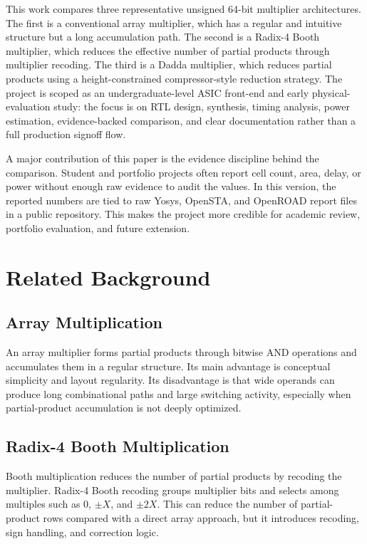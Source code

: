 \documentclass[conference]{IEEEtran}
\begin{document}
This work compares three representative unsigned 64-bit multiplier architectures. The first is a conventional array multiplier, which has a regular and intuitive structure but a long accumulation path. The second is a Radix-4 Booth multiplier, which reduces the effective number of partial products through multiplier recoding. The third is a Dadda multiplier, which reduces partial products using a height-constrained compressor-style reduction strategy. The project is scoped as an undergraduate-level ASIC front-end and early physical-evaluation study: the focus is on RTL design, synthesis, timing analysis, power estimation, evidence-backed comparison, and clear documentation rather than a full production signoff flow.

A major contribution of this paper is the evidence discipline behind the comparison. Student and portfolio projects often report cell count, area, delay, or power without enough raw evidence to audit the values. In this version, the reported numbers are tied to raw Yosys, OpenSTA, and OpenROAD report files in a public repository. This makes the project more credible for academic review, portfolio evaluation, and future extension.

\section{Related Background}

\subsection{Array Multiplication}
An array multiplier forms partial products through bitwise AND operations and accumulates them in a regular structure. Its main advantage is conceptual simplicity and layout regularity. Its disadvantage is that wide operands can produce long combinational paths and large switching activity, especially when partial-product accumulation is not deeply optimized.

\subsection{Radix-4 Booth Multiplication}
Booth multiplication reduces the number of partial products by recoding the multiplier. Radix-4 Booth recoding groups multiplier bits and selects among multiples such as 0, $\pm X$, and $\pm 2X$. This can reduce the number of partial-product rows compared with a direct array approach, but it introduces recoding, sign handling, and correction logic.
\end{document}
